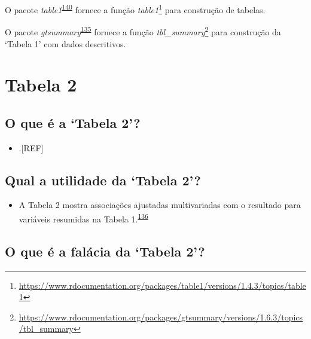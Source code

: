\documentclass[
  a4paper,
]{book}
\providecommand{\tightlist}{%
  \setlength{\itemsep}{0pt}\setlength{\parskip}{0pt}}
\renewcommand{\href}[2]{#2\footnote{\url{#1}}}
\newenvironment{infobox}[1]
  {
  \begin{itemize}
  \renewcommand{\labelitemi}{
    \raisebox{-.7\height}[0pt][0pt]{
      {\setkeys{Gin}{width=3em,keepaspectratio}
        \texttt{[image: \#1]}}
    }
  }
  \setlength{\fboxsep}{1em}
  \begin{blackbox}
  \item
  }
  {
  \end{blackbox}
  \end{itemize}
  }
\begin{document}
\begin{infobox}{images/Rlogo}
O pacote \emph{table1}\textsuperscript{\protect\hyperlink{ref-table1}{140}} fornece a função \href{https://www.rdocumentation.org/packages/table1/versions/1.4.3/topics/table1}{\emph{table1}} para construção de tabelas.

\end{infobox}

\begin{infobox}{images/Rlogo}
O pacote \emph{gtsummary}\textsuperscript{\protect\hyperlink{ref-gtsummary-2}{135}} fornece a função \href{https://www.rdocumentation.org/packages/gtsummary/versions/1.6.3/topics/tbl_summary}{\emph{tbl\_summary}} para construção da `Tabela 1' com dados descritivos.

\end{infobox}

\hypertarget{tabela-2}{%
\section{Tabela 2}\label{tabela-2}}

\hypertarget{o-que-uxe9-a-tabela-2}{%
\subsection{O que é a `Tabela 2'?}\label{o-que-uxe9-a-tabela-2}}

\begin{itemize}
\tightlist
\item
  .{[}REF{]}
\end{itemize}

\hypertarget{qual-a-utilidade-da-tabela-2}{%
\subsection{Qual a utilidade da `Tabela 2'?}\label{qual-a-utilidade-da-tabela-2}}

\begin{itemize}
\tightlist
\item
  A Tabela 2 mostra associações ajustadas multivariadas com o resultado para variáveis resumidas na Tabela 1.\textsuperscript{\protect\hyperlink{ref-Westreich2013}{136}}
\end{itemize}

\hypertarget{o-que-uxe9-a-faluxe1cia-da-tabela-2}{%
\subsection{O que é a falácia da `Tabela 2'?}\label{o-que-uxe9-a-faluxe1cia-da-tabela-2}}
\end{document}
